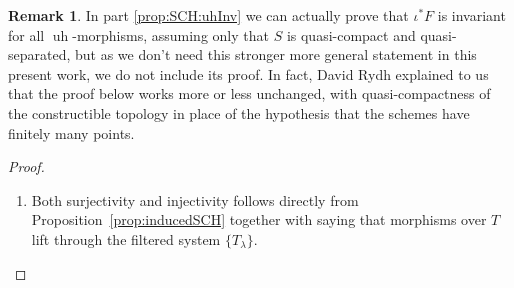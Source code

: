 \documentclass[10pt]{amsart}
\theoremstyle{definition}
\newtheorem{rema}[theo]{Remark}
\newcommand{\uh}{\operatorname{uh}}
\begin{document}
\begin{rema}
In part \eqref{prop:SCH:uhInv} we can actually prove that $\iota^*F$ is invariant for all $\uh$-morphisms, assuming only that $S$ is quasi-compact and quasi-separated, but as we don't need this stronger more general statement in this present work, we do not include its proof. In fact, David Rydh explained to us that the proof below works more or less unchanged, with quasi-compactness of the constructible topology in place of the hypothesis that the schemes have finitely many points. 
\end{rema}

\begin{proof}\ 
\begin{enumerate}
 \item Both surjectivity and injectivity follows directly from Proposition~\ref{prop:inducedSCH} together with \cite[Thm.8.8.2]{EGAIV3} saying that morphisms over $T$ lift through the filtered system $\{T_\lambda\}$.

 


\end{enumerate}
\end{proof}
\end{document}
